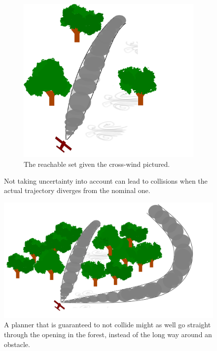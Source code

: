 \begin{figure}
\begin{subfigure}{0.5\textwidth}
    \includegraphics[width=\textwidth]{figures/experiments/experiment-setup-funnel}
    \caption{The reachable set given the cross-wind pictured.}
  \end{subfigure}
  \caption{Not taking uncertainty into account can lead to collisions when the
    actual trajectory diverges from the nominal one.}
\end{figure}

\begin{figure}
  \centering \includegraphics[scale=0.1]{figures/experiments/aggressive-maneuver}
  \caption{A planner that is guaranteed to not collide might as well go straight
    through the opening in the forest, instead of the long way around an
    obstacle.}
  \label{fig:aggressive-maneuver}
\end{figure}

